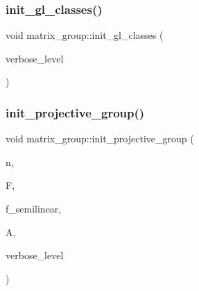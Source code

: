 \mbox{\label{classmatrix__group_a5f08c24debccc24b4c64033622a3fc0a}} 
\subsubsection{\texorpdfstring{init\+\_\+gl\+\_\+classes()}{init\_gl\_classes()}}
{\footnotesize\ttfamily void matrix\+\_\+group\+::init\+\_\+gl\+\_\+classes (\begin{DoxyParamCaption}\item[{\mbox{\hyperlink{galois_8h_a09fddde158a3a20bd2dcadb609de11dc}{I\+NT}}}]{verbose\+\_\+level }\end{DoxyParamCaption})}

\mbox{\label{classmatrix__group_a626286de5799c4c9e45216e735b1d233}} 
\subsubsection{\texorpdfstring{init\+\_\+projective\+\_\+group()}{init\_projective\_group()}}
{\footnotesize\ttfamily void matrix\+\_\+group\+::init\+\_\+projective\+\_\+group (\begin{DoxyParamCaption}\item[{\mbox{\hyperlink{galois_8h_a09fddde158a3a20bd2dcadb609de11dc}{I\+NT}}}]{n,  }\item[{\mbox{\hyperlink{classfinite__field}{finite\+\_\+field}} $\ast$}]{F,  }\item[{\mbox{\hyperlink{galois_8h_a09fddde158a3a20bd2dcadb609de11dc}{I\+NT}}}]{f\+\_\+semilinear,  }\item[{\mbox{\hyperlink{classaction}{action}} $\ast$}]{A,  }\item[{\mbox{\hyperlink{galois_8h_a09fddde158a3a20bd2dcadb609de11dc}{I\+NT}}}]{verbose\+\_\+level }\end{DoxyParamCaption})}

\mbox{\label{classmatrix__group_adf67c0031ec58afbbc545e65a1cf6845}} 
